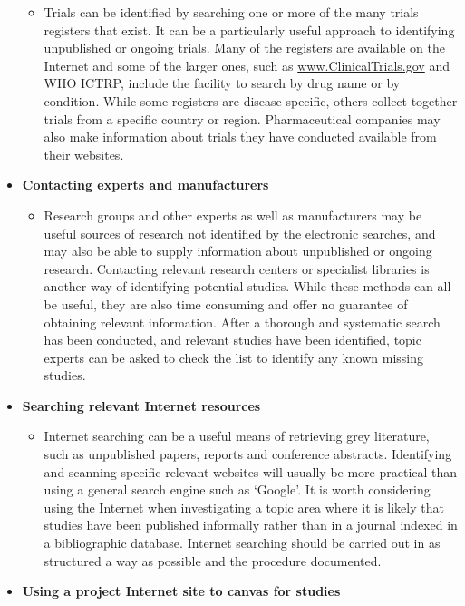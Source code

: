\documentclass[
  11pt,
  a4paper,
  DIV=11,
  numbers=noendperiod]{scrreprt}
\providecommand{\tightlist}{%
  \setlength{\itemsep}{0pt}\setlength{\parskip}{0pt}}
\begin{document}
\begin{itemize}
  \begin{itemize}
  \tightlist
  \item
    Trials can be identified by searching one or more of the many trials
    registers that exist. It can be a particularly useful approach to
    identifying unpublished or ongoing trials. Many of the registers are
    available on the Internet and some of the larger ones, such as
    \href{http://www.ClinicalTrials.gov/}{www.ClinicalTrials.gov} and
    WHO ICTRP, include the facility to search by drug name or by
    condition. While some registers are disease specific, others collect
    together trials from a specific country or region. Pharmaceutical
    companies may also make information about trials they have conducted
    available from their websites.
  \end{itemize}
\item
  \textbf{Contacting experts and manufacturers}

  \begin{itemize}
  \tightlist
  \item
    Research groups and other experts as well as manufacturers may be
    useful sources of research not identified by the electronic
    searches, and may also be able to supply information about
    unpublished or ongoing research. Contacting relevant research
    centers or specialist libraries is another way of identifying
    potential studies. While these methods can all be useful, they are
    also time consuming and offer no guarantee of obtaining relevant
    information. After a thorough and systematic search has been
    conducted, and relevant studies have been identified, topic experts
    can be asked to check the list to identify any known missing
    studies.
  \end{itemize}
\item
  \textbf{Searching relevant Internet resources}

  \begin{itemize}
  \tightlist
  \item
    Internet searching can be a useful means of retrieving grey
    literature, such as unpublished papers, reports and conference
    abstracts. Identifying and scanning specific relevant websites will
    usually be more practical than using a general search engine such as
    `Google'. It is worth considering using the Internet when
    investigating a topic area where it is likely that studies have been
    published informally rather than in a journal indexed in a
    bibliographic database. Internet searching should be carried out in
    as structured a way as possible and the procedure documented.
  \end{itemize}
\item
  \textbf{Using a project Internet site to canvas for studies}


\end{itemize}
\end{document}
